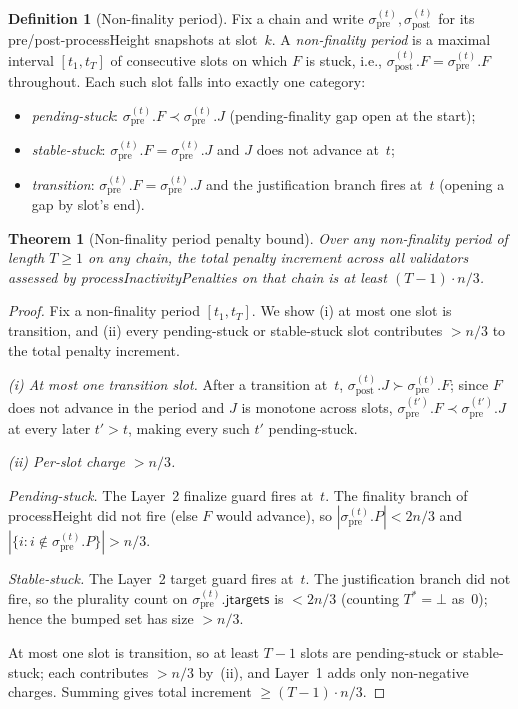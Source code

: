 \ifx\litemode\undefined\documentclass{article}\fi
\newcommand{\jtargets}{\mathsf{jtargets}}
\newcommand{\processHeight}{\textsf{processHeight}\xspace}
\newcommand{\processInactivityPenalties}{\textsf{processInactivityPenalties}\xspace}
\theoremstyle{plain}
\newtheorem{theorem}{Theorem}
\theoremstyle{definition}
\newtheorem{definition}{Definition}
\theoremstyle{remark}
\begin{document}
\begin{definition}[Non-finality period]\label{def:non-finality-period}
Fix a chain and write $\sigma_{\mathrm{pre}}^{(t)}, \sigma_{\mathrm{post}}^{(t)}$ for its pre/post-\processHeight snapshots at slot~$k$.
A \emph{non-finality period} is a maximal interval $[t_1, t_T]$ of consecutive slots on which $F$ is stuck, i.e., $\sigma_{\mathrm{post}}^{(t)}.F = \sigma_{\mathrm{pre}}^{(t)}.F$ throughout.
Each such slot falls into exactly one category:
\begin{itemize}
  \item \emph{pending-stuck}: $\sigma_{\mathrm{pre}}^{(t)}.F \prec \sigma_{\mathrm{pre}}^{(t)}.J$ (pending-finality gap open at the start);
  \item \emph{stable-stuck}: $\sigma_{\mathrm{pre}}^{(t)}.F = \sigma_{\mathrm{pre}}^{(t)}.J$ and $J$ does not advance at~$t$;
  \item \emph{transition}: $\sigma_{\mathrm{pre}}^{(t)}.F = \sigma_{\mathrm{pre}}^{(t)}.J$ and the justification branch fires at~$t$ (opening a gap by slot's end).
\end{itemize}
\end{definition}

\begin{theorem}[Non-finality period penalty bound]\label{thm:tightness}
Over any non-finality period of length $T \geq 1$ on any chain, the total penalty increment across all validators assessed by \processInactivityPenalties on that chain is at least $(T - 1) \cdot n/3$.
\end{theorem}

\begin{proof}
Fix a non-finality period $[t_1, t_T]$.
We show (i) at most one slot is transition, and (ii) every pending-stuck or stable-stuck slot contributes $> n/3$ to the total penalty increment.

\emph{(i) At most one transition slot.}
After a transition at~$t$, $\sigma_{\mathrm{post}}^{(t)}.J \succ \sigma_{\mathrm{pre}}^{(t)}.F$; since $F$ does not advance in the period and $J$ is monotone across slots, $\sigma_{\mathrm{pre}}^{(t')}.F \prec \sigma_{\mathrm{pre}}^{(t')}.J$ at every later $t' > t$, making every such $t'$ pending-stuck.

\emph{(ii) Per-slot charge $> n/3$.}

\emph{Pending-stuck.} The Layer~2 finalize guard fires at~$t$.
The finality branch of \processHeight did not fire (else $F$ would advance), so $|\sigma_{\mathrm{pre}}^{(t)}.P| < 2n/3$ and $|\{i : i \notin \sigma_{\mathrm{pre}}^{(t)}.P\}| > n/3$.

\emph{Stable-stuck.} The Layer~2 target guard fires at~$t$.
The justification branch did not fire, so the plurality count on $\sigma_{\mathrm{pre}}^{(t)}.\jtargets$ is $< 2n/3$ (counting $T^* = \bot$ as~$0$); hence the bumped set has size $> n/3$.

At most one slot is transition, so at least $T - 1$ slots are pending-stuck or stable-stuck; each contributes $> n/3$ by~(ii), and Layer~1 adds only non-negative charges.
Summing gives total increment $\geq (T-1) \cdot n/3$.
\end{proof}
\end{document}
